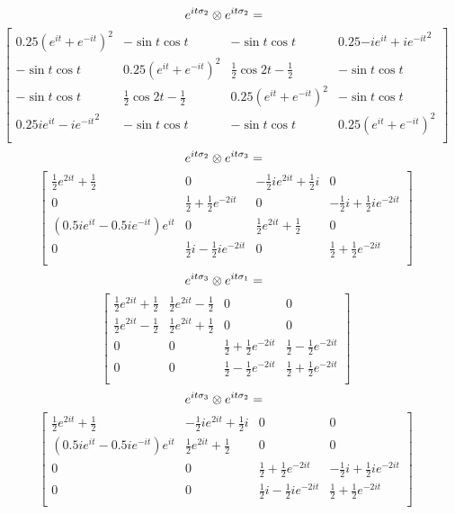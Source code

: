 \documentclass{article}
\begin{document}
\[ e^{it\sigma_2} \otimes e^{it\sigma_2} = \\ \] \[\left[
    \begin{array}{cccc}
    0.25(e^{it} + e^{-it})^2 & -\sin{t}\cos{t} & -\sin{t}\cos{t} & 0.25{-ie^{it} + ie^{-it}}^2 \\
    -\sin{t}\cos{t} & 0.25(e^{it} + e^{-it})^2 & \frac{1}{2}\cos{2t} - \frac{1}{2} & -\sin{t}\cos{t} \\
    -\sin{t}\cos{t} & \frac{1}{2}\cos{2t} - \frac{1}{2} & 0.25(e^{it} + e^{-it})^2 & -\sin{t}\cos{t} \\
    0.25{ie^{it} - ie^{-it}}^2 & -\sin{t}\cos{t} & -\sin{t}\cos{t} & 0.25(e^{it} + e^{-it})^2 \\
    \end{array}
    \right]  \]
\[ e^{it\sigma_2} \otimes e^{it\sigma_3} = \\ \] \[ \left[
    \begin{array}{cccc}
    \frac{1}{2}e^{2it} + \frac{1}{2} & 0 & -\frac{1}{2}ie^{2it} + \frac{1}{2}i & 0 \\
    0 & \frac{1}{2} + \frac{1}{2}e^{-2it} & 0 & -\frac{1}{2}i + \frac{1}{2}ie^{-2it} \\
    ({0.5ie^{it} - 0.5ie^{-it}})e^{it} & 0 & \frac{1}{2}e^{2it} + \frac{1}{2} & 0 \\
    0 & \frac{1}{2}i - \frac{1}{2}ie^{-2it} & 0 & \frac{1}{2} + \frac{1}{2}e^{-2it} \\
    \end{array}
    \right]  \]
\[ e^{it\sigma_3} \otimes e^{it\sigma_1} = \\ \] \[  \left[
    \begin{array}{cccc}
    \frac{1}{2}e^{2it} + \frac{1}{2} & \frac{1}{2}e^{2it} - \frac{1}{2} & 0 & 0 \\
    \frac{1}{2}e^{2it} - \frac{1}{2} & \frac{1}{2}e^{2it} + \frac{1}{2} & 0 & 0 \\
    0 & 0 & \frac{1}{2} + \frac{1}{2}e^{-2it} & \frac{1}{2} - \frac{1}{2}e^{-2it} \\
    0 & 0 & \frac{1}{2} - \frac{1}{2}e^{-2it} & \frac{1}{2} + \frac{1}{2}e^{-2it} \\
    \end{array}
    \right]  \]
\[ e^{it\sigma_3} \otimes e^{it\sigma_2} = \\ \] \[ \left[
    \begin{array}{cccc}
    \frac{1}{2}e^{2it} + \frac{1}{2} & -\frac{1}{2}ie^{2it} + \frac{1}{2}i & 0 & 0 \\
    ({0.5ie^{it} - 0.5ie^{-it}})e^{it} & \frac{1}{2}e^{2it} + \frac{1}{2} & 0 & 0 \\
    0 & 0 & \frac{1}{2} + \frac{1}{2}e^{-2it} & -\frac{1}{2}i + \frac{1}{2}ie^{-2it} \\
    0 & 0 & \frac{1}{2}i - \frac{1}{2}ie^{-2it} & \frac{1}{2} + \frac{1}{2}e^{-2it} \\
    \end{array}
    \right]   \]
\end{document}

